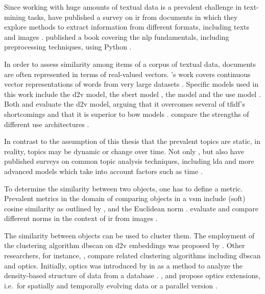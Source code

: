Since working with huge amounts of textual data is a prevalent challenge in text-mining tasks,
\citeauthor{InformationRetrieval1999} have published a survey on \ac{ir} from documents in which
they explore methods to extract information from different formats, including texts and images \cite{InformationRetrieval1999}.
\citeauthor{nlp-book2009} published a book covering the \ac{nlp} fundamentals, including preprocessing techniques, using Python \cite{nlp-book2009}.

In order to assess similarity among items of a corpus of textual data, documents are often represented in terms of real-valued vectors.
\citeauthor{WordRep2013}'s work covers continuous vector representations of words from very large datasets \cite{WordRep2013}.
Specific models used in this work include 
the \ac{d2v} model, the \ac{sbert} model \cite{HfsentTrans2019}, the \infersent{} model \cite{inferSent2018} and the \ac{use} model \cite{UniversalSentEnc2018}.
Both \citeauthor{clusteringDocs2020} and \citeauthor{SentRep2014} evaluate the \ac{d2v} model, 
arguing that it overcomes several of \ac{tfidf}'s shortcomings \cite{clusteringDocs2020} and that it is superior to \ac{bow} models \cite{SentRep2014}.
\citeauthor{UniversalSentEnc2018} compare the strengths of different \ac{use} architectures \cite{UniversalSentEnc2018}.

In contrast to the assumption of this thesis that the prevalent topics are static, in reality, topics may be dynamic or change over time.
Not only \citeauthor{topic_modeling2015}, but also \citeauthor{topic_modeling2020} have published surveys on common topic analysis techniques, 
including \ac{lda} and more advanced models which take into account factors such as time \cite{topic_modeling2015, topic_modeling2020}.

To determine the similarity between two objects, one has to define a metric.
Prevalent metrics in the domain of comparing objects in a \ac{vsm} include (soft) cosine similarity 
as outlined by \citeauthor{soft_cosine2014}, \citeauthor{soft_cosine2017} \cite{soft_cosine2014, soft_cosine2017}
and the Euclidean norm \cite{euclidean_l2_norm2015}.
\citeauthor{euclidean_l2_norm2015} evaluate and compare different norms in the context of \ac{ir} from images \cite{euclidean_l2_norm2015}.


The similarity between objects can be used to cluster them.
The employment of the clustering algorithm \ac{dbscan} on \ac{d2v} embeddings was proposed by \citeauthor{clusteringDocs2020} \cite{clusteringDocs2020}.
Other researchers, for instance, \citeauthor{OPTICS_kMeans_2016}, compare related clustering algorithms including \ac{dbscan} and \ac{optics}.
Initially, \ac{optics} was introduced by \citeauthor{OPTICS1999} in \citeyear{OPTICS1999} as a method to analyze the density-based structure of data from a database \cite{OPTICS1999}.
\citeauthor{OPTICS2013}, \citeauthor{OPTICS2014} and \citeauthor{OPTICS2016} propose \ac{optics} extensions, 
i.e.\ for spatially and temporally evolving data or a parallel version \cite{OPTICS2013, OPTICS2014, OPTICS2016}.


